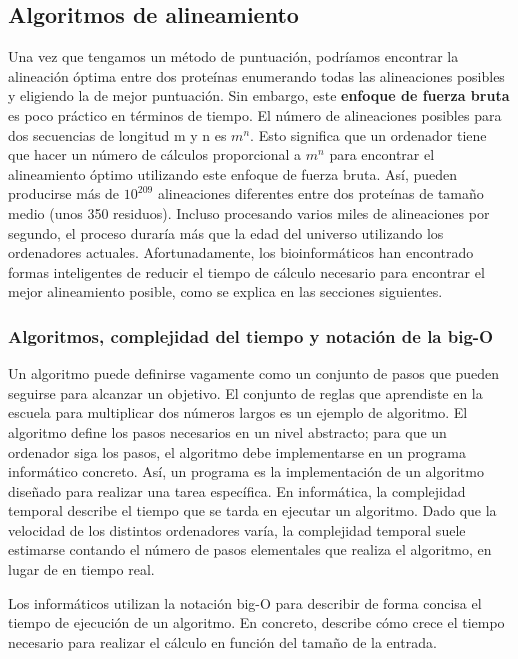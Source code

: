 \subsection{Algoritmos de alineamiento}
Una vez que tengamos un método de puntuación, podríamos encontrar la alineación óptima entre dos proteínas enumerando todas las alineaciones posibles y eligiendo la de mejor puntuación. Sin embargo, este \textbf{enfoque de fuerza bruta} es poco práctico en términos de tiempo. El número de alineaciones posibles para dos secuencias de longitud m y n es $m^n$. Esto significa que un ordenador tiene que hacer un número de cálculos proporcional a $m^n$ para encontrar el alineamiento óptimo utilizando este enfoque de fuerza bruta. Así, pueden producirse más de $10^209$ alineaciones diferentes entre dos proteínas de tamaño medio (unos 350 residuos). Incluso procesando varios miles de alineaciones por segundo, el proceso duraría más que la edad del universo utilizando los ordenadores actuales. Afortunadamente, los bioinformáticos han encontrado formas inteligentes de reducir el tiempo de cálculo necesario para encontrar el mejor alineamiento posible, como se explica en las secciones siguientes.

\subsubsection{Algoritmos, complejidad del tiempo y notación de la big-O}
Un algoritmo puede definirse vagamente como un conjunto de pasos que pueden seguirse para alcanzar un objetivo. El conjunto de reglas que aprendiste en la escuela para multiplicar dos números largos es un ejemplo de algoritmo. El algoritmo define los pasos necesarios en un nivel abstracto; para que un ordenador siga los pasos, el algoritmo debe implementarse en un programa informático concreto. Así, un programa es la implementación de un algoritmo diseñado para realizar una tarea específica. En informática, la complejidad temporal describe el tiempo que se tarda en ejecutar un algoritmo. Dado que la velocidad de los distintos ordenadores varía, la complejidad temporal suele estimarse contando el número de pasos elementales que realiza el algoritmo, en lugar de en tiempo real. 

Los informáticos utilizan la notación big-O para describir de forma concisa el tiempo de ejecución de un algoritmo. En concreto, describe cómo crece el tiempo necesario para realizar el cálculo en función del tamaño de la entrada. 

